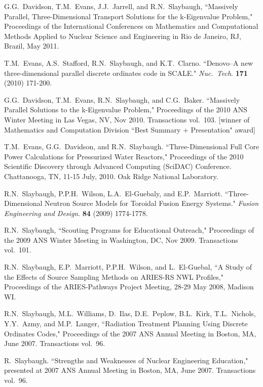 \begin{bibsection}
\item G.G.\ Davidson, T.M.\ Evans, J.J.\ Jarrell, and R.N.\ Slaybaugh, ``Massively Parallel, Three-Dimensional Transport Solutions for the k-Eigenvalue Problem," Proceedings of the International Conferences on Mathematics and Computational Methods Applied to Nuclear Science and Engineering in Rio de Janeiro, RJ, Brazil, May 2011.

\item T.M.\ Evans, A.S.\ Stafford, R.N.\ Slaybaugh, and K.T.\ Clarno. ``Denovo--A new three-dimensional parallel discrete ordinates code in SCALE." \textit{Nuc.\ Tech}. \textbf{171} (2010) 171-200.

\item G.G.\ Davidson, T.M.\ Evans, R.N.\ Slaybaugh, and C.G.\ Baker.  ``Massively Parallel Solutions to the k-Eigenvalue Problem," Proceedings of the 2010 ANS Winter Meeting in Las Vegas, NV, Nov 2010. Transactions vol.\ 103. [winner of Mathematics and Computation Division ``Best Summary + Presentation" award]

\item T.M.\ Evans, G.G.\ Davidson, and R.N.\ Slaybaugh.  ``Three-Dimensional Full Core Power Calculations for Pressurized Water Reactors," Proceedings of the 2010 Scientific Discovery through Advanced Computing (SciDAC) Conference. Chattanooga, TN, 11-15 July, 2010. Oak Ridge National Laboratory.

\item R.N.\ Slaybaugh, P.P.H.\ Wilson, L.A.\ El-Guebaly, and E.P.\ Marriott. ``Three-Dimensional Neutron Source Models for Toroidal Fusion Energy Systems." \textit{Fusion Engineering and Design}. \textbf{84} (2009) 1774-1778. 

\item R.N.\ Slaybaugh, ``Scouting Programs for Educational Outreach," Proceedings of the 2009 ANS Winter Meeting in Washington, DC, Nov 2009. Transactions vol.\ 101.

\item R.N.\ Slaybaugh, E.P.\ Marriott, P.P.H.\ Wilson, and L.\ El-Guebal, ``A Study of the Effects of Source Sampling Methods on ARIES-RS NWL Profiles," Proceedings of the ARIES-Pathways Project Meeting, 28-29 May 2008, Madison WI. 

\item R.N.\ Slaybaugh, M.L.\ Williams, D.\ Ilas, D.E.\ Peplow, B.L.\ Kirk, T.L.\ Nichols, Y.Y.\ Azmy, and M.P.\ Langer, ``Radiation Treatment Planning Using Discrete Ordinates Codes," Proceedings of the 2007 ANS Annual Meeting in Boston, MA, June 2007. Transactions vol.\ 96.

\item R.\ Slaybaugh. ``Strengths and Weaknesses of Nuclear Engineering Education," presented at 2007 ANS Annual Meeting in Boston, MA, June 2007. Transactions vol.\ 96.
\end{bibsection}

